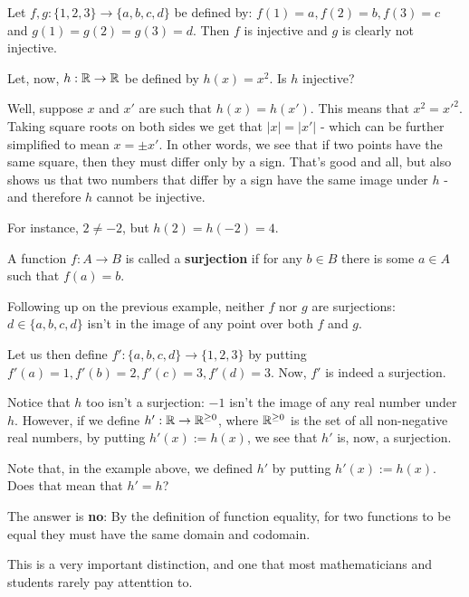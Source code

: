 \begin{ex}
	Let $f,g:\{1,2,3\}\to\{a,b,c,d\}$ be defined by: $f(1)=a,f(2)=b,f(3)=c$ and $g(1)=g(2)=g(3)=d$. Then $f$ is injective and $g$ is clearly not injective.
	
	\bigskip 
	Let, now, $h:\mathbb R\to\mathbb R$ be defined by $h(x)=x^2$. Is $h$ injective?
	
	Well, suppose $x$ and $x'$ are such that $h(x)=h(x')$. This means that $x^2=x'^2$. Taking square roots on both sides we get that $\lvert x\rvert=\lvert x'\rvert$ - which can be further simplified to mean $x=\pm x'$. In other words, we see that if two points have the same square, then they must differ only by a sign. That's good and all, but also shows us that two numbers that differ by a sign have the same image under $h$ - and therefore $h$ cannot be injective.
	
	For instance, $2\neq -2$, but $h(2)=h(-2)=4$.
\end{ex}

\begin{df}
	A function $f:A\to B$ is called a \textbf{surjection} if for any $b\in B$ there is some $a\in A$ such that $f(a)=b$.
\end{df}

\begin{ex}
	Following up on the previous example, neither $f$ nor $g$ are surjections: $d\in \{a,b,c,d\}$ isn't in the image of any point over both $f$ and $g$.
	
	Let us then define $f':\{a,b,c,d\}\to \{1,2,3\}$ by putting $f'(a)=1,f'(b)=2,f'(c)=3,f'(d)=3$. Now, $f'$ is indeed a surjection.
	
	\bigskip
	Notice that $h$ too isn't a surjection: $-1$ isn't the image of any real number under $h$. However, if we define $h':\mathbb R\to\mathbb R^{\geq0}$, where $\mathbb R^{\geq0}$ is the set of all non-negative real numbers, by putting $h'(x):=h(x)$, we see that $h'$ is, now, a surjection.
\end{ex}

\begin{rmk}
	Note that, in the example above, we defined $h'$ by putting $h'(x):=h(x)$. Does that mean that $h'=h$?
	
	The answer is \textbf{no}: By the definition of function equality, for two functions to be equal they must have the same domain and codomain.
	
	This is a very important distinction, and one that most mathematicians and students rarely pay attenttion to.
\end{rmk}

